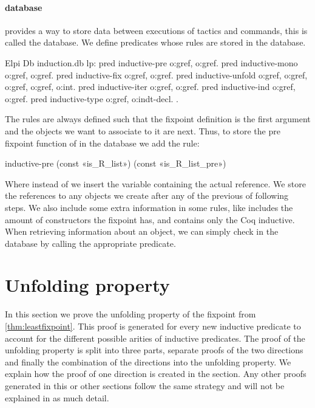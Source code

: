 \documentclass[thesis.tex]{subfiles}
\begin{document}
\paragraph{\ce database}
\ce provides a way to store data between executions of tactics and commands, this is called the database. We define predicates whose rules are stored in the database.
\begin{coqcode}
  Elpi Db induction.db lp:{{
    pred inductive-pre o:gref, o:gref.
    pred inductive-mono o:gref, o:gref.
    pred inductive-fix o:gref, o:gref.
    pred inductive-unfold o:gref, o:gref, o:gref, 
                          o:gref, o:int.
    pred inductive-iter o:gref, o:gref.
    pred inductive-ind o:gref, o:gref.
    pred inductive-type o:gref, o:indt-decl.
  }}.
\end{coqcode}
The rules are always defined such that the fixpoint definition is the first argument and the objects we want to associate to it are next. Thus, to store the pre fixpoint function of  in the database we add the rule:
\begin{elpicode}
  inductive-pre (const «is_R_list») 
                (const «is_R_list_pre»)
\end{elpicode}
Where instead of  we insert the variable containing the actual reference. We store the references to any objects we create after any of the previous of following steps. We also include some extra information in some rules, like  includes the amount of constructors the fixpoint has, and  contains only the Coq inductive. When retrieving information about an object, we can simply check in the database by calling the appropriate predicate.

\section{Unfolding property}\label{sec:unfolding}
In this section we prove the unfolding property of the fixpoint from \cref{thm:leastfixpoint}. This proof is generated for every new inductive predicate to account for the different possible arities of inductive predicates. The proof of the unfolding property is split into three parts, separate proofs of the two directions and finally the combination of the directions into the unfolding property. We explain how the proof of one direction is created in the section. Any other proofs generated in this or other sections follow the same strategy and will not be explained in as much detail.
\end{document}
